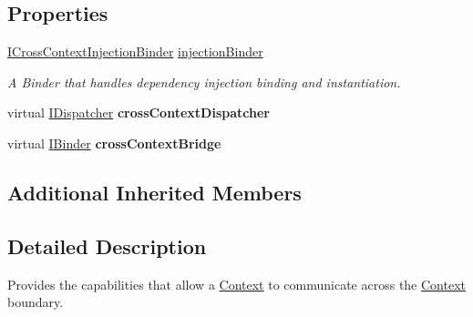 \subsection*{Properties}
\begin{DoxyCompactItemize}
\item 
\hypertarget{classstrange_1_1extensions_1_1context_1_1impl_1_1_cross_context_aa9e5959a8c384f30821f024a6342da1d}{\hyperlink{interfacestrange_1_1extensions_1_1injector_1_1api_1_1_i_cross_context_injection_binder}{I\-Cross\-Context\-Injection\-Binder} \hyperlink{classstrange_1_1extensions_1_1context_1_1impl_1_1_cross_context_aa9e5959a8c384f30821f024a6342da1d}{injection\-Binder}}\label{classstrange_1_1extensions_1_1context_1_1impl_1_1_cross_context_aa9e5959a8c384f30821f024a6342da1d}

\begin{DoxyCompactList}\small\item\em A Binder that handles dependency injection binding and instantiation. \end{DoxyCompactList}\item 
\hypertarget{classstrange_1_1extensions_1_1context_1_1impl_1_1_cross_context_aa020f2f7a4dbc95dd6df440197d0349e}{virtual \hyperlink{interfacestrange_1_1extensions_1_1dispatcher_1_1api_1_1_i_dispatcher}{I\-Dispatcher} {\bfseries cross\-Context\-Dispatcher}}\label{classstrange_1_1extensions_1_1context_1_1impl_1_1_cross_context_aa020f2f7a4dbc95dd6df440197d0349e}

\item 
\hypertarget{classstrange_1_1extensions_1_1context_1_1impl_1_1_cross_context_acaa1de297f6c13a502f384a5cb20b596}{virtual \hyperlink{interfacestrange_1_1framework_1_1api_1_1_i_binder}{I\-Binder} {\bfseries cross\-Context\-Bridge}}\label{classstrange_1_1extensions_1_1context_1_1impl_1_1_cross_context_acaa1de297f6c13a502f384a5cb20b596}

\end{DoxyCompactItemize}
\subsection*{Additional Inherited Members}


\subsection{Detailed Description}
Provides the capabilities that allow a \hyperlink{classstrange_1_1extensions_1_1context_1_1impl_1_1_context}{Context} to communicate across the \hyperlink{classstrange_1_1extensions_1_1context_1_1impl_1_1_context}{Context} boundary. 

